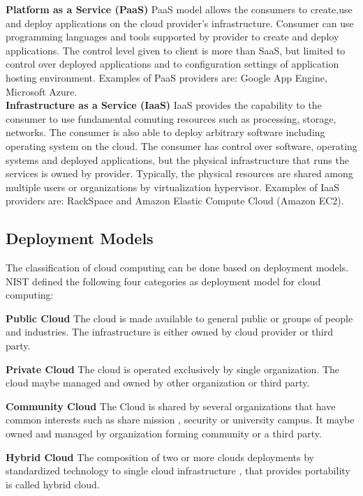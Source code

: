 \textbf{Platform as a Service (PaaS)} PaaS model allows the consumers to create,use and deploy 
applications on the cloud provider's infrastructure. Consumer can use programming languages and tools supported by provider to create and deploy applications. The control level given to client is
 more than SaaS, but limited to control over deployed applications and to configuration 
settings of application hosting environment. Examples of PaaS providers are: Google App Engine, Microsoft Azure.\\    



\textbf{Infrastructure as a Service (IaaS)} IaaS provides the capability to the consumer to use fundamental comuting resources such as processing, storage, networks. The consumer is also able to deploy arbitrary software including operating system on the cloud. The consumer has control over software, operating systems and deployed applications, but the physical infrastructure that runs the services is owned by provider. Typically, the physical resources are shared among multiple users or organizations by virtualization hypervisor. Examples of IaaS‌ providers are: RackSpace and Amazon Elastic Compute Cloud (Amazon EC2). \\ 


\subsection{Deployment Models}

The classification of cloud computing can be done based on deployment models. NIST \cite{nist} defined the following four categories as deployment model for cloud computing:

\textbf{Public Cloud} The cloud is made available to general public or groups of people and industries. The infrastructure is either owned by cloud provider or third party. 
  
\textbf{Private Cloud} The cloud is operated exclusively by single organization. The cloud maybe managed and owned by other organization or third party. 
 
\textbf{Community Cloud} The Cloud is shared by several organizations that have common interests such as share mission , security or university campus. It maybe owned and managed by organization forming community or a third party. 


\textbf{Hybrid Cloud} The composition of two or more clouds deployments by standardized technology to single cloud infrastructure , that provides portability is called hybrid cloud. \

















